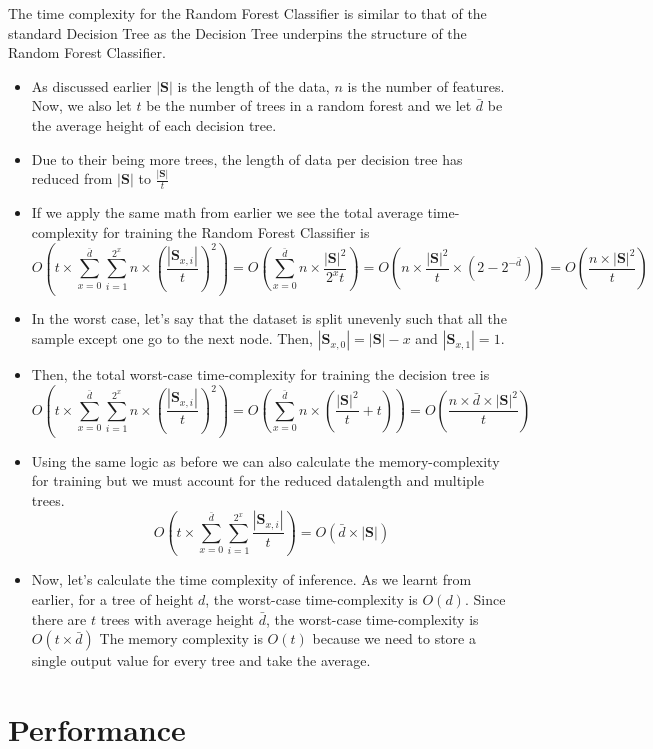  The time complexity for the Random Forest Classifier is similar to that of the standard Decision Tree as the Decision Tree underpins the structure of the Random Forest Classifier.
\begin{itemize}
	\item As discussed earlier $|\textbf{S}|$ is the length of the data, $n$ is the number of features. Now, we also let $t$ be the number of trees in a random forest and we let $\bar{d}$ be the average height of each decision tree.
	\item Due to their being more trees, the length of data per decision tree has reduced from $|\textbf{S}|$ to $\frac{|\textbf{S}|}{t}$
	\item If we apply the same math from earlier we see the total average time-complexity for training the Random Forest Classifier is 
	$$O(t\times\sum_{x=0}^{\bar{d}}\sum_{i=1}^{2^x}n\times\left(\frac{|\textbf{S}_{x,i}|}{t}\right)^2)=O(\sum_{x=0}^{\bar{d}}n\times\frac{|\textbf{S}|^2}{2^xt})=O(n\times\frac{|\textbf{S}|^2}{t}\times(2-2^{-\bar{d}}))=O(\frac{n\times|\textbf{S}|^2}{t})$$
	\item In the worst case, let's say that the dataset is split unevenly such that all the sample except one go to the next node. Then, $|\textbf{S}_{x,0}|=|\textbf{S}|-x$ and $|\textbf{S}_{x,1}|=1$.
	\item Then, the total worst-case time-complexity for training the decision tree is
	$$O(t \times \sum_{x=0}^{\bar{d}}\sum_{i=1}^{2^x}n\times\left(\frac{|\textbf{S}_{x,i}|}{t}\right)^2)=O(\sum_{x=0}^{\bar{d}}n\times(\frac{|\textbf{S}|^2}{t}+t))=O(\frac{n\times \bar{d}\times|\textbf{S}|^2}{t})$$
	\item Using the same logic as before we can also calculate the memory-complexity for training but we must account for the reduced datalength and multiple trees.
	$$O(t\times\sum_{x=0}^{\bar{d}}\sum_{i=1}^{2^x}\frac{|\textbf{S}_{x,i}|}{t})=O(\bar{d}\times|\textbf{S}|)$$
	\item Now, let's calculate the time complexity of inference. As we learnt from earlier, for a tree of height $d$, the worst-case time-complexity is $O(d)$. Since there are $t$ trees with average height $\bar{d}$, the worst-case time-complexity is $O(t\times \bar{d})$ The memory complexity is $O(t)$ because we need to store a single output value for every tree and take the average.
\end{itemize}

\section{Performance}

